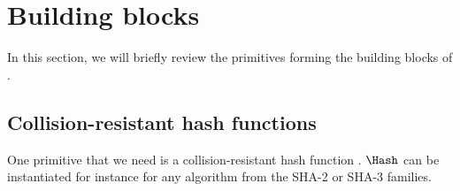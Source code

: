 \section{Building blocks}%
\label{Primitives}\label{BuildingBlocks}

In this section, we will briefly review the primitives forming the building blocks of \PRIVO.

\subsection{Collision-resistant hash functions}


One primitive that we need is a collision-resistant hash function \Hash.
\(\Hash\) can be instantiated for instance for any algorithm from the SHA-2 or SHA-3 families.











